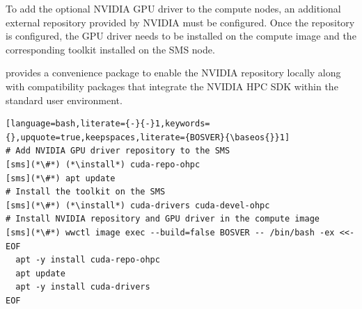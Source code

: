 To add the optional NVIDIA GPU driver to the compute nodes, an additional
external \pkgmgr{} repository provided by NVIDIA must be configured. Once the
repository is configured, the GPU driver needs to be installed on the compute
image and the corresponding toolkit installed on the SMS node.

\OHPC{} provides a convenience package to enable the NVIDIA repository locally
along with compatibility packages that integrate the NVIDIA HPC SDK within the
standard \OHPC{} user environment.

\begin{lstlisting}[language=bash,literate={-}{-}1,keywords={},upquote=true,keepspaces,literate={BOSVER}{\baseos{}}1]
# Add NVIDIA GPU driver repository to the SMS
[sms](*\#*) (*\install*) cuda-repo-ohpc
[sms](*\#*) apt update
# Install the toolkit on the SMS
[sms](*\#*) (*\install*) cuda-drivers cuda-devel-ohpc
# Install NVIDIA repository and GPU driver in the compute image
[sms](*\#*) wwctl image exec --build=false BOSVER -- /bin/bash -ex <<- EOF
  apt -y install cuda-repo-ohpc
  apt update
  apt -y install cuda-drivers
EOF
\end{lstlisting}
